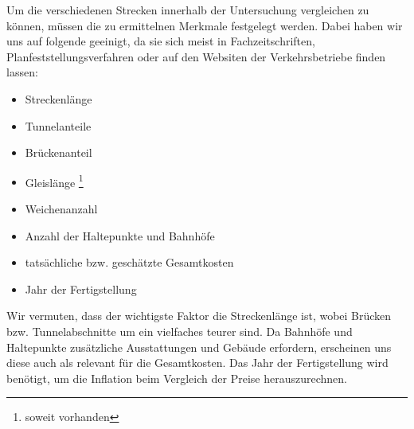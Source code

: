 Um die verschiedenen Strecken innerhalb der Untersuchung vergleichen zu können, müssen die zu ermittelnen Merkmale festgelegt werden. Dabei haben wir uns auf folgende geeinigt, da sie sich meist in Fachzeitschriften, Planfeststellungsverfahren oder auf den Websiten der Verkehrsbetriebe finden lassen:

\begin{itemize}
\item Streckenlänge
\item Tunnelanteile
\item Brückenanteil
\item Gleislänge \footnote{soweit vorhanden}\setcounter{fnnumber}{\thefootnote}
\item Weichenanzahl \footnotemark[\thefnnumber]
\item Anzahl der Haltepunkte und Bahnhöfe
\item tatsächliche bzw. geschätzte Gesamtkosten
\item Jahr der Fertigstellung
\end{itemize}

Wir vermuten, dass der wichtigste Faktor die Streckenlänge ist, wobei Brücken bzw. Tunnelabschnitte um ein vielfaches teurer sind. Da Bahnhöfe und Haltepunkte zusätzliche Ausstattungen und Gebäude erfordern, erscheinen uns diese auch als relevant für die Gesamtkosten. Das Jahr der Fertigstellung wird benötigt, um die Inflation beim Vergleich der Preise herauszurechnen.

